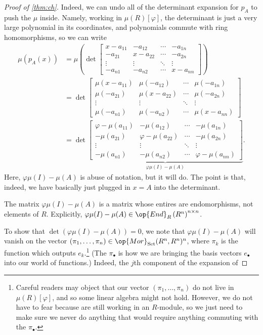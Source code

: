 \begin{proof}[Proof of \autoref{thm:ch}]
	Indeed, we can undo all of the determinant expansion for $p_A$ to push the $\mu$ inside. Namely, working in $\mu(R)[\varphi]$, the determinant is just a very large polynomial in its coordinates, and polynomials commute with ring homomorphisms, so we can write
	\begin{align*}
		\mu(p_A(x)) &= \mu\left(\det\begin{bmatrix}
			x-a_{11} & -a_{12} & \cdots & -a_{1n} \\
			-a_{21} & x-a_{22} & \cdots & -a_{2n} \\
			\vdots & \vdots & \ddots & \vdots \\
			-a_{n1} & -a_{n2} & \cdots & x-a_{nn}
		\end{bmatrix}\right) \\
		&=\det\begin{bmatrix}
			\mu(x-a_{11}) & \mu(-a_{12}) & \cdots & \mu(-a_{1n}) \\
			\mu(-a_{21}) & \mu(x-a_{22}) & \cdots & \mu(-a_{2n}) \\
			\vdots & \vdots & \ddots & \vdots \\
			\mu(-a_{n1}) & \mu(-a_{n2}) & \cdots & \mu(x-a_{nn})
		\end{bmatrix} \\
		&=\det\underbrace{\begin{bmatrix}
			\varphi-\mu(a_{11}) & -\mu(a_{12}) & \cdots & -\mu(a_{1n}) \\
			-\mu(a_{21}) & \varphi-\mu(a_{22}) & \cdots & -\mu(a_{2n}) \\
			\vdots & \vdots & \ddots & \vdots \\
			-\mu(a_{n1}) & -\mu(a_{n2}) & \cdots & \varphi-\mu(a_{nn})
		\end{bmatrix}}_{\varphi\mu(I)-\mu(A)}.
	\end{align*}
	Here, $\varphi\mu(I)-\mu(A)$ is abuse of notation, but it will do. The point is that, indeed, we have basically just plugged in $x=A$ into the determinant.
	\begin{warn}
		The matrix $\varphi\mu(I)-\mu(A)$ is a matrix whose entires are endomorphisms, not elements of $R$. Explicitly, $\varphi\mu(I)-\mu(A)\in\op{End}_R\left(R^n\right)^{n\times n}$.
	\end{warn}
	To show that $\det(\varphi\mu(I)-\mu(A))=0$, we note that $\varphi\mu(I)-\mu(A)$ will vanish on the vector $(\pi_1,\ldots,\pi_n)\in\op{Mor}_{\mathrm{Set}}(R^n,R^n)^n$, where $\pi_k$ is the function which outputs $e_k$.\footnote{Careful readers may object that our vector $(\pi_1,\ldots,\pi_n)$ do not live in $\mu(R)[\varphi]$, and so some linear algebra might not hold. However, we do not have to fear because are still working in an $R$-module, so we just need to make sure we never do anything that would require anything commuting with the $\pi_\bullet$.} (The $\pi_\bullet$ is how we are bringing the basis vectors $e_\bullet$ into our world of functions.) Indeed, the $j$th component of the expansion of

\end{proof}

